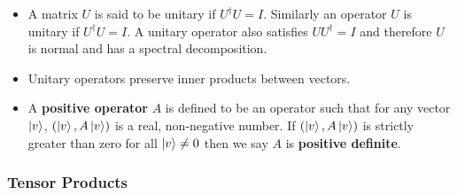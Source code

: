 \documentclass{article}
\begin{document}
\begin{itemize}
  \item A matrix $U$ is said to be unitary if $U^\dag U = I$. Similarly an operator $U$ is unitary if $U^\dag U = I$. A unitary operator also satisfies $U U^\dag = I$ and therefore $U$ is normal and has a spectral decomposition.

  \item Unitary operators preserve inner products between vectors.

  \item A \textbf{positive operator} $A$ is defined to be an operator such that for any vector $\ket{v}$, $(\ket{v}, A \ket{v})$ is a real, non-negative number. If $(\ket{v}, A \ket{v})$ is strictly greater than zero for all $\ket{v} \ne 0$ then we say $A$ is \textbf{positive definite}.
\end{itemize}

\subsubsection{Tensor Products}
\end{document}
